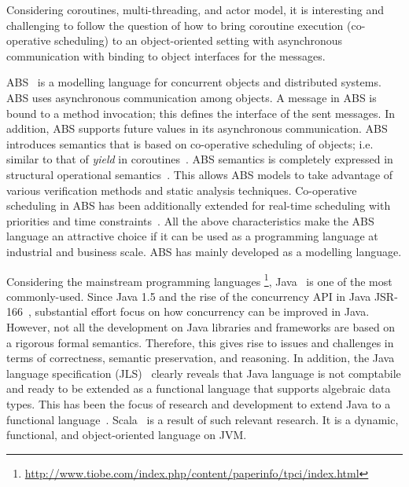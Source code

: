 Considering coroutines, multi-threading, and actor model, it is interesting and challenging to follow the question of how to bring coroutine execution (co-operative scheduling) to an object-oriented setting with asynchronous communication with binding to object interfaces for the messages.  

ABS~\cite{johnsen2012abs,hahnlehjlssw11} is a modelling language for concurrent objects and distributed systems.
ABS uses asynchronous communication among objects.
A message in ABS is bound to a method invocation;
this defines the interface of the sent messages.
In addition, ABS supports future values in its asynchronous communication.
ABS introduces  semantics that is based on co-operative scheduling of objects; 
i.e. similar to that of \emph{yield} in coroutines~\cite{creol:broch:owe}.
ABS semantics is completely expressed in structural operational semantics~\cite{plotkin:sos}.
This allows ABS models to take advantage of various verification methods and static analysis techniques.
% 
Co-operative scheduling in ABS has been additionally extended for real-time scheduling with priorities and time constraints~\cite{bjork2013:rtabs,johnsen2012modeling}.
All the above characteristics make the ABS language an attractive choice if it
can be used as a programming language at industrial and business scale.
ABS has mainly developed as a modelling language.

Considering the mainstream programming languages
\footnote{\url{http://www.tiobe.com/index.php/content/paperinfo/tpci/index.html}}, Java~\cite{gosling2000java} is one of the most commonly-used.
Since Java 1.5 and the rise of the concurrency API in Java JSR-166~\cite{jsr166}, substantial effort focus on how concurrency can be improved in Java.
However, not all the development on Java libraries and frameworks are based on a rigorous formal semantics. 
Therefore, this gives rise to issues and challenges in terms of correctness, semantic preservation, and reasoning.
In addition, the Java language specification (JLS)~\cite{gosling2000java} clearly reveals that Java language is not comptabile and ready to be extended as a functional language that supports algebraic data types.
This has been the focus of research and development to extend Java to a functional language~\cite{odersky1997pizza,henkel2003discovering,nystrom2003polyglot,bracha1998making}.
Scala~\cite{odersky2004scala} is a result of such relevant research. It is a dynamic, functional, and object-oriented language on JVM.

